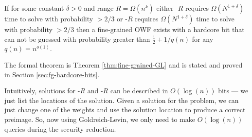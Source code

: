 \begin{theorem}
	If for some constant $\delta>0$ and range $R = \Omega(n^k)$ either \kSum-$R$ requires $\Omega(N^{1+\delta})$ time to solve with probability $>2/3$ or \zkclique-$R$ requires $\Omega(N^{1+\delta})$ time to solve with probability $>2/3$  then a fine-grained OWF exists with a hardcore bit that can not be guessed with probability greater than $\frac 1 2 +1/q(n)$ for any $q(n) = n^{o(1)}$.
\end{theorem}
The formal theorem is Theorem \ref{thm:fine-grained-GL} and is stated and proved in Section \ref{sec:fg-hardcore-bits}.

Intuitively, solutions for \kSum-$R$ and \zkclique-$R$ can be described in $O(\log(n))$ bits --- we just list the locations of the solution. Given a solution for the problem, we can just change one of the weights and use the solution location to produce a correct preimage. So, now using Goldreich-Levin, we only need to make $O(\log(n))$ queries during the security reduction.






%



